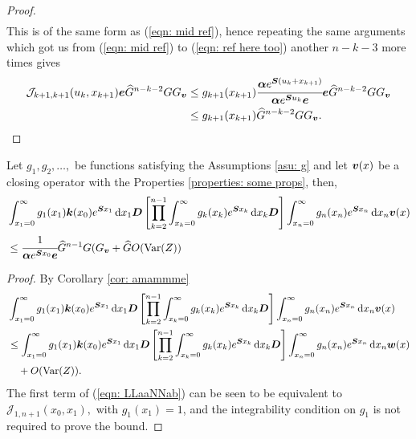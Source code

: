 \begin{proof}
\begin{align}
	\end{align} 
	This is of the same form as (\ref{eqn: mid ref}), hence repeating the same arguments which got us from (\ref{eqn: mid ref}) to (\ref{eqn: ref here too}) another \(n-k-3\) more times gives
	 \begin{align*}
		\mathcal J_{k+1,k+1}(u_k,x_{k+1}) \boldsymbol e  \widehat G^{n-k-2}G G_{\boldsymbol v}
		&\leq g_{k+1}(x_{k+1}) \cfrac{\boldsymbol\alpha e^{\boldsymbol{S}(u_k+x_{k+1})}}{\boldsymbol \alpha e^{\boldsymbol{S}u_k}\boldsymbol e} \boldsymbol e\widehat G^{n-k-2}G G_{\boldsymbol v}
		\\& \leq g_{k+1}(x_{k+1}) \widehat G^{n-k-2}G G_{\boldsymbol v}.
	\end{align*} 
\end{proof}	
\begin{cor}\label{cor: ksjkd}
	Let \(g_1, g_2, \dots,\) be functions satisfying the Assumptions \ref{asu: g} and let \(\boldsymbol v(x)\) be a closing operator with the Properties \ref{properties: some props}, then,
	\begin{align}
		&\int_{x_1=0}^\infty g_1(x_1) \boldsymbol k(x_0) e^{\boldsymbol{S}x_1}\, \mathrm{d} x_1\boldsymbol D 
            	\left[\prod_{k=2}^{n-1}\int_{x_k=0}^\infty g_k(x_k) e^{\boldsymbol{S}x_k} \, \mathrm{d} x_k \boldsymbol D\right] \int_{x_n=0}^\infty g_{n}(x_n) e^{\boldsymbol{S}x_n} \, \mathrm{d} x_n \boldsymbol v(x) \nonumber 
		\\&\leq \cfrac{1}{\boldsymbol \alpha e^{\boldsymbol{S}x_0}\boldsymbol e} \widehat{G}^{n-1}G(G_{\boldsymbol v}+\widehat G O(\mathrm{Var}(Z)) \label{eqn :mmmm}
	\end{align}
\end{cor}
\begin{proof}
	By Corollary \ref{cor: amammme} 
	\begin{align}
		&\int_{x_1=0}^\infty g_1(x_1) \boldsymbol k(x_0) e^{\boldsymbol{S}x_1}\, \mathrm{d} x_1\boldsymbol D 
            	\left[\prod_{k=2}^{n-1}\int_{x_k=0}^\infty g_k(x_k) e^{\boldsymbol{S}x_k} \, \mathrm{d} x_k \boldsymbol D\right] \int_{x_n=0}^\infty g_{n}(x_n) e^{\boldsymbol{S}x_n} \, \mathrm{d} x_n \boldsymbol v(x)\nonumber
		\\&\leq \int_{x_1=0}^\infty g_1(x_1) \boldsymbol k(x_0) e^{\boldsymbol{S}x_1}\, \mathrm{d} x_1\boldsymbol D 
		\left[\prod_{k=2}^{n-1}\int_{x_k=0}^\infty g_k(x_k) e^{\boldsymbol{S}x_k} \, \mathrm{d} x_k \boldsymbol D\right] \int_{x_n=0}^\infty g_{n}(x_n) e^{\boldsymbol{S}x_n} \, \mathrm{d} x_n\boldsymbol w(x) \nonumber
		\\&\quad{} + O(\mathrm{Var}(Z)). \label{eqn: LLaaNNab}
	\end{align}
	The first term of (\ref{eqn: LLaaNNab}) can be seen to be equivalent to \(\mathcal J_{1,n+1}(x_0,x_1),\) with \(g_1(x_1)=1\), and the integrability condition on \(g_1\) is not required to prove the bound. 
\end{proof}

